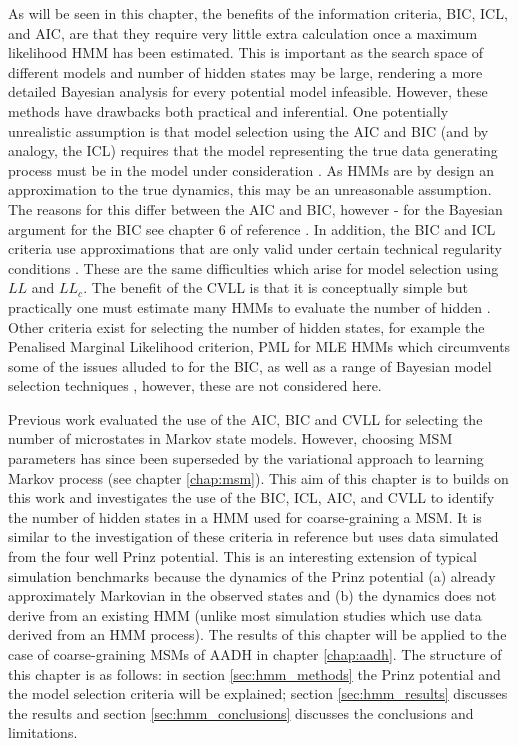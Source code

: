 As will be seen in this chapter, the benefits of the information criteria, BIC, ICL, and AIC, are that they require  very little extra calculation once a maximum likelihood HMM has been estimated. This is important as the search space of different models and number of hidden states may be large, rendering a more detailed Bayesian analysis for every potential model infeasible. However, these methods have drawbacks both practical and inferential. One potentially unrealistic assumption is that model selection using the AIC and BIC (and by analogy, the ICL) requires that the model representing the true data generating process must be in the model under consideration \cite{ripley_1996}. As HMMs are by design an approximation to the true dynamics, this may be an unreasonable assumption. The reasons for this differ between the AIC and BIC, however - for the Bayesian argument for the BIC see chapter 6 of reference \cite{bernardo2007bayesian}. In addition, the BIC and ICL criteria use approximations that are only valid under certain technical regularity conditions \cite{mclachlanFiniteMixtureModels2000}. These are the same difficulties which arise for  model selection using $LL$ and $LL_{c}$.  The benefit of the CVLL  is that it is conceptually simple but practically  one must estimate many HMMs to evaluate the number of hidden \cite{celeuxSelectingHiddenMarkov2008}. Other criteria exist for selecting the number of hidden states, for example the Penalised Marginal Likelihood criterion, PML \cite{gassiatLikelihoodRatioInequalities2002} for MLE HMMs which circumvents some of the issues alluded to for the BIC, as well as a range of Bayesian model selection techniques \cite{gelmanBayesianDataAnalysis2014,bernardo2007bayesian}, however, these are not considered here. 


Previous work \cite{mcgibbonStatisticalModelSelection2014a} evaluated the use of the AIC, BIC and CVLL for selecting the number of microstates in Markov state models. However, choosing MSM parameters has since been superseded by the variational approach to learning Markov process (see chapter \ref{chap:msm}). This aim of this chapter is to builds on this work and investigates the use of the BIC, ICL, AIC, and CVLL to identify the number of hidden states in a HMM used for coarse-graining a MSM. It is similar to the investigation of these criteria in reference \cite{celeuxSelectingHiddenMarkov2008} but uses data simulated from the four well Prinz potential. This is an interesting extension of typical simulation benchmarks because the dynamics of the Prinz potential (a) already approximately Markovian in the observed states \cite{prinzMarkovModelsMolecular2011} and (b) the dynamics does not derive from an existing HMM (unlike most simulation studies which use data derived from an HMM process). The results of this chapter will be applied to the case of coarse-graining MSMs of AADH in chapter \ref{chap:aadh}.  The structure of this chapter is as follows: in section \ref{sec:hmm_methods} the Prinz potential and the model selection criteria will be explained; section \ref{sec:hmm_results} discusses the results and section \ref{sec:hmm_conclusions} discusses the conclusions and limitations.


